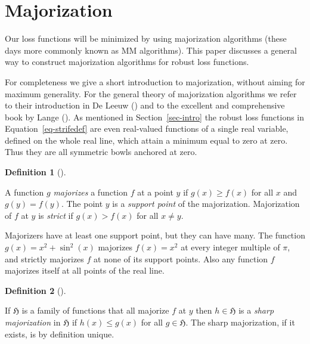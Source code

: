 \documentclass[
  12pt,
  letterpaper,
  DIV=11,
  numbers=noendperiod]{scrartcl}
\newcommand{\sectionbreak}{\pagebreak}
\theoremstyle{definition}
\newtheorem{definition}{Definition}[section]
\theoremstyle{definition}
\theoremstyle{plain}
\theoremstyle{plain}
\theoremstyle{plain}
\theoremstyle{remark}
\begin{document}
\sectionbreak

\section{Majorization}\label{sec-major}

Our loss functions will be minimized by using majorization algorithms
(these days more commonly known as MM algorithms). This paper discusses
a general way to construct majorization algorithms for robust loss
functions.

For completeness we give a short introduction to majorization, without
aiming for maximum generality. For the general theory of majorization
algorithms we refer to their introduction in De Leeuw
() and to the excellent and
comprehensive book by Lange (). As
mentioned in Section~\ref{sec-intro} the robust loss functions in
Equation~\ref{eq-strifedef} are even real-valued functions of a single
real variable, defined on the whole real line, which attain a minimum
equal to zero at zero. Thus they are all symmetric bowls anchored at
zero.

\begin{definition}[]\protect\hypertarget{def-majorize}{}\label{def-majorize}

A function \(g\) \emph{majorizes} a function \(f\) at a point \(y\) if
\(g(x)\geq f(x)\) for all \(x\) and \(g(y)=f(y)\). The point \(y\) is a
\emph{support point} of the majorization. Majorization of \(f\) at \(y\)
is \emph{strict} if \(g(x)>f(x)\) for all \(x\not= y\).

\end{definition}

Majorizers have at least one support point, but they can have many. The
function \(g(x)=x^2+\sin^2(x)\) majorizes \(f(x)=x^2\) at every integer
multiple of \(\pi\), and strictly majorizes \(f\) at none of its support
points. Also any function \(f\) majorizes itself at all points of the
real line.

\begin{definition}[]\protect\hypertarget{def-sharp}{}\label{def-sharp}

If \(\mathfrak{H}\) is a family of functions that all majorize \(f\) at
\(y\) then \(h\in\mathfrak{H}\) is a \emph{sharp majorization} in
\(\mathfrak{H}\) if \(h(x)\leq g(x)\) for all \(g\in\mathfrak{H}\). The
sharp majorization, if it exists, is by definition unique.

\end{definition}
\end{document}
